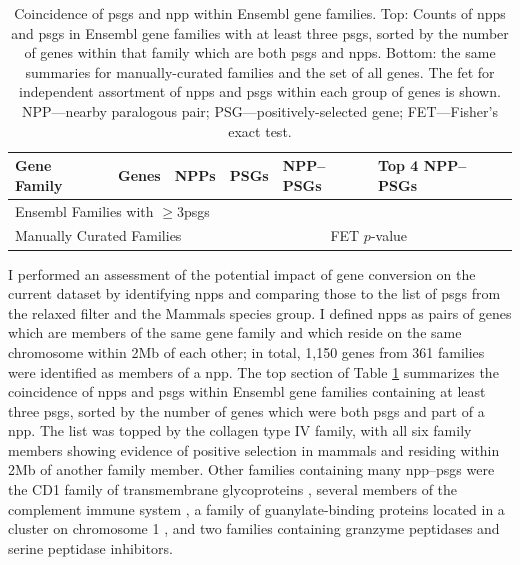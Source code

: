 \begin{table}
\centering \footnotesize
\begin{tabular}{lrrrrrl}

\toprule

Gene Family & Genes & NPPs & PSGs &
\multicolumn{2}{l}{NPP--PSGs} & Top 4 NPP--PSGs \\

\midrule
\multicolumn{4}{l}{Ensembl Families with $\geq 3$\acp{psg}} & & & \\
\midrule



\midrule
\multicolumn{4}{l}{Manually Curated Families} & & \multicolumn{2}{l}{FET $p$-value} \\
\midrule



\bottomrule
\end{tabular}
\caption{Coincidence of \acp{psg} and \ac{npp} within Ensembl gene
  families. Top: Counts of \acp{npp} and \acp{psg} in Ensembl gene
  families with at least three \acp{psg}, sorted by the number of
  genes within that family which are both \acp{psg} and
  \acp{npp}. Bottom: the same summaries for manually-curated families
  and the set of all genes. The \ac{fet} \pv for independent
  assortment of \acp{npp} and \acp{psg} within each group of genes is
  shown. NPP---nearby paralogous pair; PSG---positively-selected gene;
  FET---Fisher's exact test.}
\label{table_psg_fams}
\end{table}

I performed an assessment of the potential impact of gene conversion
on the current dataset by identifying \acp{npp} and comparing those to
the list of \psgefive \acp{psg} from the relaxed \sw filter and the
Mammals species group. I defined \acp{npp} as pairs of genes which are
members of the same \ens gene family and which reside on the same
chromosome within 2Mb of each other; in total, 1,150 genes from 361
\ens families were identified as members of a \ac{npp}. The top
section of Table \ref{table_psg_fams} summarizes the coincidence of
\acp{npp} and \acp{psg} within Ensembl gene families containing at
least three \acp{psg}, sorted by the number of genes which were both
\acp{psg} and part of a \ac{npp}. The list was topped by the collagen
type IV family, with all six family members showing evidence of positive
selection in mammals and residing within 2Mb of another family
member. Other families containing many \ac{npp}--\acp{psg} were the
CD1 family of transmembrane glycoproteins \citep{Joyce2001}, several
members of the complement immune system \citep{Nonaka2006}, a family
of guanylate-binding proteins located in a cluster on chromosome 1
\citep{Olszewski2006}, and two families containing granzyme peptidases
and serine peptidase inhibitors.

